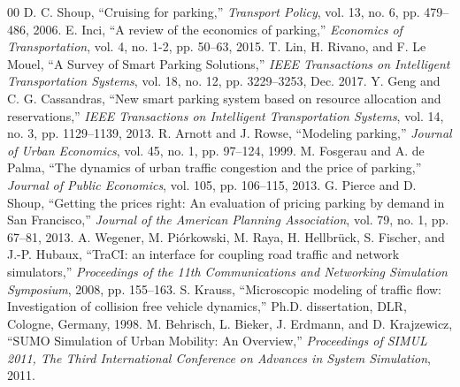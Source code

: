 \documentclass[conference]{IEEEtran}
\begin{document}
\begin{thebibliography}{00}
     D. C. Shoup, ``Cruising for parking,'' \textit{Transport Policy}, vol. 13, no. 6, pp. 479--486, 2006.
     E. Inci, ``A review of the economics of parking,'' \textit{Economics of Transportation}, vol. 4, no. 1-2, pp. 50--63, 2015.
     T. Lin, H. Rivano, and F. Le Mouel, ``A Survey of Smart Parking Solutions,'' \textit{IEEE Transactions on Intelligent Transportation Systems}, vol. 18, no. 12, pp. 3229--3253, Dec. 2017.
     Y. Geng and C. G. Cassandras, ``New smart parking system based on resource allocation and reservations,'' \textit{IEEE Transactions on Intelligent Transportation Systems}, vol. 14, no. 3, pp. 1129--1139, 2013.
     R. Arnott and J. Rowse, ``Modeling parking,'' \textit{Journal of Urban Economics}, vol. 45, no. 1, pp. 97--124, 1999.
     M. Fosgerau and A. de Palma, ``The dynamics of urban traffic congestion and the price of parking,'' \textit{Journal of Public Economics}, vol. 105, pp. 106--115, 2013.
     G. Pierce and D. Shoup, ``Getting the prices right: An evaluation of pricing parking by demand in San Francisco,'' \textit{Journal of the American Planning Association}, vol. 79, no. 1, pp. 67--81, 2013.
     A. Wegener, M. Piórkowski, M. Raya, H. Hellbrück, S. Fischer, and J.-P. Hubaux, ``TraCI: an interface for coupling road traffic and network simulators,'' \textit{Proceedings of the 11th Communications and Networking Simulation Symposium}, 2008, pp. 155--163.
     S. Krauss, ``Microscopic modeling of traffic flow: Investigation of collision free vehicle dynamics,'' Ph.D. dissertation, DLR, Cologne, Germany, 1998.
     M. Behrisch, L. Bieker, J. Erdmann, and D. Krajzewicz, ``SUMO Simulation of Urban Mobility: An Overview,'' \textit{Proceedings of SIMUL 2011, The Third International Conference on Advances in System Simulation}, 2011.
\end{thebibliography}
\end{document}
